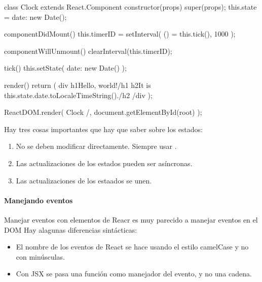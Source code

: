 %
\begin{sphinxVerbatim}[commandchars=\\\{\}]
class Clock extends React.Component \PYGZob{}
  constructor(props) \PYGZob{}
    super(props);
    this.state = \PYGZob{}date: new Date()\PYGZcb{};
  \PYGZcb{}

  componentDidMount() \PYGZob{}
    this.timerID = setInterval(
      () =\PYGZgt{} this.tick(),
      1000
    );
  \PYGZcb{}

  componentWillUnmount() \PYGZob{}
    clearInterval(this.timerID);
  \PYGZcb{}

  tick() \PYGZob{}
    this.setState(\PYGZob{}
      date: new Date()
    \PYGZcb{});
  \PYGZcb{}

  render() \PYGZob{}
    return (
      \PYGZlt{}div\PYGZgt{}
        \PYGZlt{}h1\PYGZgt{}Hello, world!\PYGZlt{}/h1\PYGZgt{}
        \PYGZlt{}h2\PYGZgt{}It is \PYGZob{}this.state.date.toLocaleTimeString()\PYGZcb{}.\PYGZlt{}/h2\PYGZgt{}
      \PYGZlt{}/div\PYGZgt{}
    );
  \PYGZcb{}
\PYGZcb{}

ReactDOM.render(
  \PYGZlt{}Clock /\PYGZgt{},
  document.getElementById(\PYGZsq{}root\PYGZsq{})
);
\end{sphinxVerbatim}

Hay tres cosas importantes que hay que saber sobre los estados:
\begin{enumerate}
\item {} 
No se deben modificar directamente. Siempre usar .

\item {} 
Las actualizaciones de los estados pueden ser asíncronas.

\item {} 
Las actualizaciones de los estaados se unen.

\end{enumerate}


\paragraph{Manejando eventos}
\label{\detokenize{reactjs:manejando-eventos}}
Manejar eventos con elementos de Reacr es muy parecido a manejar eventos en
el DOM Hay alagunas diferencias sintácticas:
\begin{itemize}
\item {} 
El nombre de los eventos de React se hace usando el estilo camelCase y no con minúsculas.

\item {} 
Con JSX se pasa una función como manejador del evento, y no una cadena.

\end{itemize}

